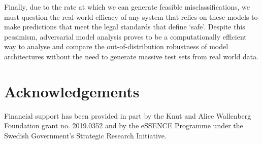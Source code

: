 Finally, due to the rate at which we can generate feasible misclassifications, we must question the real-world efficacy of any system that relies on these models to make predictions that meet the legal standards that define `safe'.
Despite this pessimism, adversarial model analysis proves to be a computationally efficient way to analyse and compare the out-of-distribution robustness of model architectures without the need to generate massive test sets from real world data.

\section{Acknowledgements}
Financial support has been provided in part by the Knut and Alice Wallenberg Foundation grant no. 2019.0352 and by the eSSENCE Programme under the Swedish Government’s Strategic Research Initiative.

\FloatBarrier




